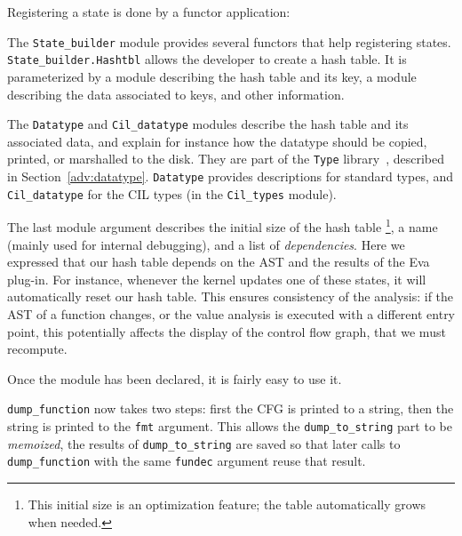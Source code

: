 Registering a state is done by a functor application:


The \texttt{State\_builder} module provides several functors that help
registering states. \texttt{State\_builder.Hashtbl} allows the developer to
create a hash table. It is parameterized by a module describing the hash table
and its key, a module describing the data associated to keys, and
other information.

The \texttt{Datatype} and \texttt{Cil\_datatype} modules describe the
hash table and its associated data, and explain for instance how the
datatype should be copied, printed, or marshalled to the disk. They
are part of the \texttt{Type} library~\cite{signoles:jfla11}, described in
Section~\ref{adv:datatype}. \texttt{Datatype} provides
descriptions for standard \caml types, and \texttt{Cil\_datatype} for
the CIL types (in the \texttt{Cil\_types} module).

The last module argument describes the initial size of the hash table%
\footnote{This initial size is an optimization feature; the table automatically
grows when needed.}, a name (mainly used for internal debugging),
and a list of \emph{dependencies}.
Here we expressed that our hash table depends on the AST and the results of the
\textsf{Eva} plug-in. For instance, whenever the \framac kernel updates one of
these states, it will automatically reset our hash table.
This ensures consistency of the analysis: if the AST of a function changes,
or the value analysis is executed with a different entry point,
this potentially affects the display of the control flow graph,
that we must recompute.

Once the module has been declared, it is fairly easy to use it.


\texttt{dump\_function} now takes two steps: first the CFG is printed
to a string, then the string is printed to the \texttt{fmt}
argument. This allows the \texttt{dump\_to\_string} part to be
\emph{memoized}, \ie the results of \texttt{dump\_to\_string} are
saved so that later calls to \texttt{dump\_function} with the same
\texttt{fundec} argument reuse that result.

